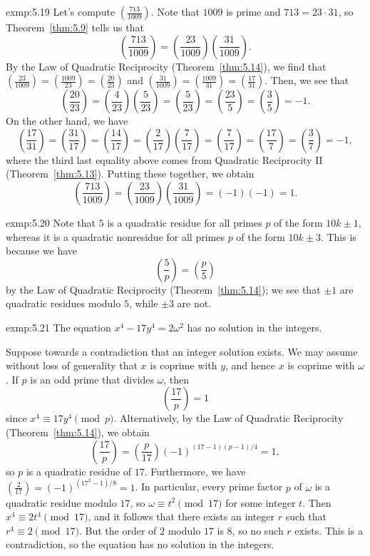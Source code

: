 \begin{exmp}{exmp:5.19}
    Let's compute $(\frac{713}{1009})$. Note that $1009$ is prime and $713 
    = 23 \cdot 31$, so Theorem~\ref{thm:5.9} tells us that 
    \[ \left( \frac{713}{1009} \right) = \left( \frac{23}{1009} \right) 
    \left( \frac{31}{1009} \right). \] 
    By the Law of Quadratic Reciprocity (Theorem~\ref{thm:5.14}), we find that 
    $(\frac{23}{1009}) = (\frac{1009}{23}) = (\frac{20}{23})$ and 
    $(\frac{31}{1009}) = (\frac{1009}{31}) = (\frac{17}{31})$. Then, we see that 
    \[ \left( \frac{20}{23} \right) = \left( \frac{4}{23} \right) 
    \left( \frac{5}{23} \right) = \left( \frac{5}{23} \right) = 
    \left( \frac{23}{5} \right) = \left( \frac{3}{5} \right) = -1. \] 
    On the other hand, we have 
    \[ \left( \frac{17}{31} \right) = \left( \frac{31}{17} \right) = 
    \left( \frac{14}{17} \right) = \left( \frac{2}{17} \right) 
    \left( \frac{7}{17} \right) = \left( \frac{7}{17} \right) = 
    \left( \frac{17}{7} \right) = \left( \frac{3}{7} \right) = -1, \] 
    where the third last equality above comes from Quadratic Reciprocity II 
    (Theorem~\ref{thm:5.13}). Putting these together, we obtain 
    \[ \left( \frac{713}{1009} \right) = \left( \frac{23}{1009} \right) 
    \left( \frac{31}{1009} \right) = (-1)(-1) = 1. \] 
\end{exmp}

\begin{exmp}{exmp:5.20}
    Note that $5$ is a quadratic residue for all primes $p$ of the form $10k \pm 1$, 
    whereas it is a quadratic nonresidue for all primes $p$ of the form $10k \pm 3$. 
    This is because we have 
    \[ \left( \frac{5}{p} \right) = \left( \frac{p}{5} \right) \] 
    by the Law of Quadratic Reciprocity (Theorem~\ref{thm:5.14}); we see that 
    $\pm1$ are quadratic residues modulo $5$, while $\pm3$ are not. 
\end{exmp}

\begin{exmp}{exmp:5.21}
    The equation $x^4 - 17y^4 = 2\omega^2$ has no solution in the integers. 

    Suppose towards a contradiction that an integer solution exists. We may 
    assume without loss of generality that $x$ is coprime with $y$, and hence 
    $x$ is coprime with $\omega$. If $p$ is an odd prime that divides $\omega$, then 
    \[ \left( \frac{17}{p} \right) = 1 \] 
    since $x^4 \equiv 17y^4 \pmod p$. Alternatively, by the Law of Quadratic 
    Reciprocity (Theorem~\ref{thm:5.14}), we obtain 
    \[ \left( \frac{17}{p} \right) = \left( \frac{p}{17} \right) 
    (-1)^{(17-1)(p-1)/4} = 1, \] 
    so $p$ is a quadratic residue of $17$. Furthermore, we have $(\frac{2}{17}) 
    = (-1)^{(17^2-1)/8} = 1$. In particular, every prime factor $p$ of 
    $\omega$ is a quadratic residue modulo $17$, so $\omega \equiv t^2 \pmod{17}$ 
    for some integer $t$. Then $x^4 \equiv 2t^4 \pmod{17}$, and it follows that 
    there exists an integer $r$ such that $r^4 \equiv 2 \pmod{17}$. But the 
    order of $2$ modulo $17$ is $8$, so no such $r$ exists. This is a contradiction, 
    so the equation has no solution in the integers. 
\end{exmp}

